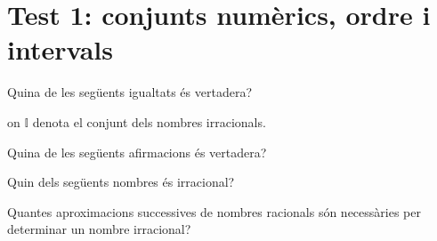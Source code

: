 \section{Test 1: conjunts numèrics, ordre i intervals}

\begin{enumerate}
\pregunta Quina de les següents igualtats és vertadera?

\begin{enumerate}
\end{enumerate}
\feedback


on $\mathbb{I}$ denota el conjunt dels nombres irracionals.

\pregunta Quina de les següents afirmacions és vertadera?

\begin{enumerate}
\end{enumerate}
\feedback


\pregunta Quin dels següents nombres és irracional?

\begin{enumerate}
\end{enumerate}
\feedback


\pregunta Quantes aproximacions successives de nombres
racionals són necessàries per determinar un nombre irracional?

\begin{enumerate}
\end{enumerate}
\feedback



\end{enumerate}

